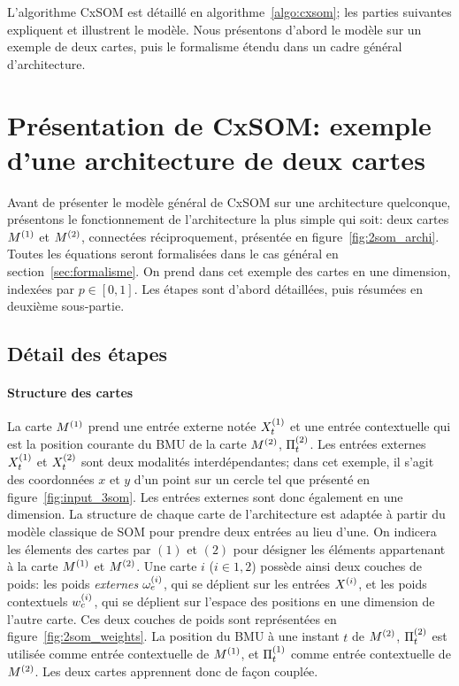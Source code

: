 \documentclass[../main]{subfiles}
\begin{document}
L'algorithme CxSOM est détaillé en algorithme~\ref{algo:cxsom}; les parties suivantes expliquent et illustrent le modèle. Nous présentons d'abord le modèle sur un exemple de deux cartes, puis le formalisme étendu dans un cadre général d'architecture.

\section{Présentation de CxSOM: exemple d'une architecture de deux cartes}

Avant de présenter le modèle général de CxSOM sur une architecture quelconque, présentons le fonctionnement de l'architecture la plus simple qui soit: deux cartes $M^{({1})}$ et $M^{({2})}$, connectées réciproquement, présentée en figure~\ref{fig:2som_archi}. Toutes les équations seront formalisées dans le cas général en section~\ref{sec:formalisme}. 
On prend dans cet exemple des cartes en une dimension, indexées par $p \in [0,1]$. Les étapes sont d'abord détaillées, puis résumées en deuxième sous-partie.

\subsection{Détail des étapes}
\paragraph{Structure des cartes}
La carte $M^{({1})}$ prend une entrée externe notée $X^{({1})}_t$ et une entrée contextuelle qui est la position courante du BMU de la carte $M^{({2})}$, $\Pi^{({2})}_t$. Les entrées externes $X^{({1})}_t$ et $X^{({2})}_t$ sont deux modalités interdépendantes; dans cet exemple, il s'agit des coordonnées $x$ et $y$ d'un point sur un cercle tel que présenté en figure~\ref{fig:input_3som}. Les entrées externes sont donc également en une dimension.
La structure de chaque carte de l'architecture est adaptée à partir du modèle classique de SOM pour prendre deux entrées au lieu d'une. On indicera les élements des cartes par $(1)$ et $(2)$ pour désigner les éléments appartenant à la carte $M^{({1})}$ et $M^{({2})}$.
Une carte $i$ ($i \in {1,2}$) possède ainsi deux couches de poids: les poids \emph{externes} $\omega_e^{({i})}$,  qui se déplient sur les entrées $X^{({i})}$, et les poids contextuels $w_c^{({i})}$, qui se déplient sur l'espace des positions en une dimension de l'autre carte. Ces deux couches de poids sont représentées en figure~\ref{fig:2som_weights}. La position du BMU à une instant $t$ de $M^{({2})}$, $\Pi^{({2})}_t$ est utilisée comme entrée contextuelle de $M^{({1})}$, et $\Pi^{({1})}_t$ comme entrée contextuelle de $M^{({2})}$. Les deux cartes apprennent donc de façon couplée.
\end{document}
